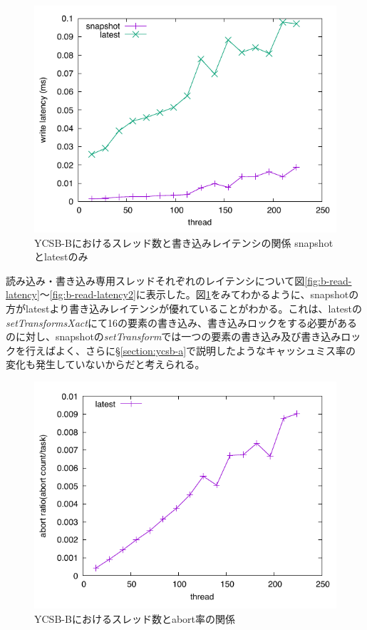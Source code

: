 \documentclass[a4paper]{jreport}	%
\begin{document}
\begin{figure}[h] 
\centering
\includegraphics[width=15cm]{ycsb-b/opposite-write-latency2}
\caption{YCSB-Bにおけるスレッド数と書き込みレイテンシの関係 snapshotとlatestのみ}
\label{fig:b-write-latency2}
\end{figure}

読み込み・書き込み専用スレッドそれぞれのレイテンシについて図\ref{fig:b-read-latency}〜\ref{fig:b-read-latency2}に表示した。図\ref{fig:b-write-latency2}をみてわかるように、snapshotの方がlatestより書き込みレイテンシが優れていることがわかる。これは、latestの\textit{setTransformsXact}にて16の要素の書き込み、書き込みロックをする必要があるのに対し、snapshotの\textit{setTransform}では一つの要素の書き込み及び書き込みロックを行えばよく、さらに§\ref{section:ycsb-a}で説明したようなキャッシュミス率の変化も発生していないからだと考えられる。


\begin{figure}[h] 
\centering
\includegraphics[width=15cm]{ycsb-b/opposite-abort}
\caption{YCSB-Bにおけるスレッド数とabort率の関係}
\label{fig:b-abort}
\end{figure}
\end{document}
